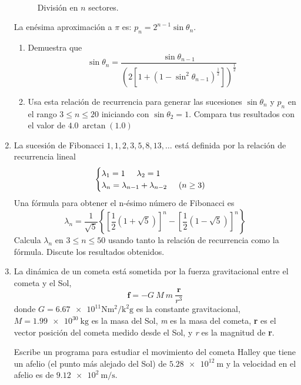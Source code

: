 \documentclass[12pt]{article}
\begin{document}
\begin{enumerate}
\\
\begin{figure}[H]
\centering

\caption{División en $n$ sectores.}
\end{figure}
La enésima aproximación a $\pi$ es: $p_{n}= 2^{n-1} \sin \theta_{n}$.
\begin{enumerate}
\item Demuestra que
\[\sin \theta_{n} = \dfrac{\sin \theta_{n - 1}}{\left( 2 \left[ 1 + (1 - \sin^{2}\theta_{n - 1})^{\frac{1}{2}} \right] \right)^{\frac{1}{2}}} \]
\item Usa esta relación de recurrencia para generar las sucesiones $\sin \theta_{n}$ y $p_{n}$ en el rango $3 \leq n \leq 20$ iniciando con $\sin \theta_{2} = 1$. Compara tus resultados con el valor de $4.0 \: \arctan(1.0)$
\end{enumerate}
\item La sucesión de Fibonacci $1, 1, 2, 3, 5, 8, 13,\ldots$ está definida por la relación de recurrencia lineal
\begin{equation*}
\begin{cases}
\lambda_{1} = 1 \hspace{0.5cm} \lambda_{2}= 1 \\
\lambda_{n} = \lambda_{n - 1} + \lambda_{n - 2} \hspace{0.5cm} (n \geq 3)
\end{cases}
\end{equation*}
Una fórmula para obtener el n-ésimo número de Fibonacci es
\[ \lambda_{n} = \dfrac{1}{\sqrt{5}} \left\lbrace \left[ \dfrac{1}{2} (1 + \sqrt{5}) \right]^{n} - \left[ \dfrac{1}{2} (1 - \sqrt{5}) \right]^{n} \right\rbrace \]
Calcula $\lambda_{n}$ en $3\leq n \leq 50$ usando tanto la relación de recurrencia como la fórmula. Discute los resultados obtenidos.
\item La dinámica de un cometa está sometida por la fuerza gravitacional entre el cometa y el Sol, 
\[ \textbf{f} = -G \: M \: m \:  \dfrac{\textbf{r}}{r^{3}} \]
donde $ G= \num{6.67e11} \si{\newton\square\meter\per\square\kilo\gram}$ es la constante gravitacional, $M = \SI{1.99e30}{\kilo\gram}$ es la masa del Sol, \textit{m} es la masa del cometa, \textbf{r} es el vector posición del cometa medido desde el Sol, y \textit{r} es la magnitud de \textbf{r}.
\par
Escribe un programa para estudiar el movimiento del cometa Halley que tiene un afelio (el punto más alejado del Sol) de $\SI{5.28e12}{\meter}$ y la velocidad en el afelio es de $\SI{9.12e2}{\meter\per\second}$.

\end{enumerate}
\end{document}
